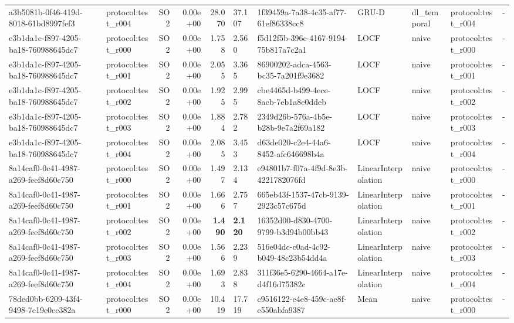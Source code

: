 \begin{table}[htbp]
\begin{tabular}{llrrr}
a3b5081b-0f46-419d-8018-61bd8997fef3 & protocol:test\_r004 & SO2 & 0.00e+00 & 28.070 & 37.107 & 1f39459a-7a38-4c35-af77-61ef86338cc8 & GRU-D & dl\_temporal & protocol:test\_r004 & - \\
e3b1da1c-f897-4205-ba18-760988645dc7 & protocol:test\_r000 & SO2 & 0.00e+00 & 1.758 & 2.560 & f5d12f5b-396c-4167-9194-75b817a7c2a1 & LOCF & naive & protocol:test\_r000 & - \\
e3b1da1c-f897-4205-ba18-760988645dc7 & protocol:test\_r001 & SO2 & 0.00e+00 & 2.055 & 3.365 & 86900202-adca-4563-bc35-7a201f9e3682 & LOCF & naive & protocol:test\_r001 & - \\
e3b1da1c-f897-4205-ba18-760988645dc7 & protocol:test\_r002 & SO2 & 0.00e+00 & 1.925 & 2.995 & cbe4465d-b499-4ece-8acb-7eb1a8e0ddeb & LOCF & naive & protocol:test\_r002 & - \\
e3b1da1c-f897-4205-ba18-760988645dc7 & protocol:test\_r003 & SO2 & 0.00e+00 & 1.884 & 2.782 & 2349d26b-576a-4b5e-b28b-9e7a2f69a182 & LOCF & naive & protocol:test\_r003 & - \\
e3b1da1c-f897-4205-ba18-760988645dc7 & protocol:test\_r004 & SO2 & 0.00e+00 & 2.085 & 3.453 & d63de020-c2e4-44a6-8452-afc646698b4a & LOCF & naive & protocol:test\_r004 & - \\
8a14caf0-0c41-4987-a269-feef8d60c750 & protocol:test\_r000 & SO2 & 0.00e+00 & 1.497 & 2.134 & e94801b7-f07a-4f9d-8e3b-4221782076fd & LinearInterpolation & naive & protocol:test\_r000 & - \\
8a14caf0-0c41-4987-a269-feef8d60c750 & protocol:test\_r001 & SO2 & 0.00e+00 & 1.666 & 2.757 & 665eb43f-1537-47cb-9139-2923c57c675d & LinearInterpolation & naive & protocol:test\_r001 & - \\
8a14caf0-0c41-4987-a269-feef8d60c750 & protocol:test\_r002 & SO2 & 0.00e+00 & \textbf{1.490} & \textbf{2.120} & 16352d00-d830-4700-9799-b3d94b00bb43 & LinearInterpolation & naive & protocol:test\_r002 & - \\
8a14caf0-0c41-4987-a269-feef8d60c750 & protocol:test\_r003 & SO2 & 0.00e+00 & 1.566 & 2.239 & 516e04dc-c0ad-4c92-b049-48c23b54dd4a & LinearInterpolation & naive & protocol:test\_r003 & - \\
8a14caf0-0c41-4987-a269-feef8d60c750 & protocol:test\_r004 & SO2 & 0.00e+00 & 1.693 & 2.838 & 311f36e5-6290-4664-a17e-d4f16d75382c & LinearInterpolation & naive & protocol:test\_r004 & - \\
78ded0bb-6209-43f4-9498-7c19e0cc382a & protocol:test\_r000 & SO2 & 0.00e+00 & 10.419 & 17.719 & c9516122-e4e8-459c-ae8f-e550abfa9387 & Mean & naive & protocol:test\_r000 & - \\

\end{tabular}
\end{table}
